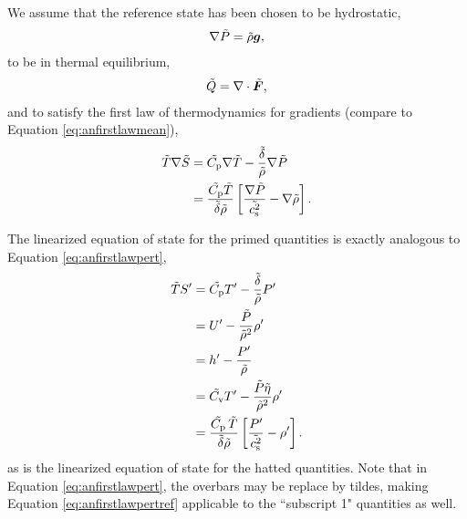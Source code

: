 \documentclass[12pt]{article}
\newcommand{\vecf}{\bm{F}}
\begin{document}
We assume that the reference state has been chosen to be hydrostatic,
\begin{align}\label{eq:refhydro}
	\nabla \tilde{P} = \tilde{\rho}\bm{g},
\end{align}
to be in thermal equilibrium,
\begin{align}\label{eq:refthermalequil}
	\tilde{Q} = \Div\tilde{\vecf},
\end{align}
and to satisfy the first law of thermodynamics for gradients (compare to Equation \eqref{eq:anfirstlawmean}),
\begin{subequations}\label{eq:reffirstlawmean}
	\begin{align}
		\tilde{T}\nabla\tilde{S} &= \tilde{C_{\rm{p}}}\nabla\tilde{T} - \frac{\tilde{\delta} }{\tilde{\rho}}\nabla\tilde{P} \\
		&= \frac{\tilde{C_{\rm{p}}}\tilde{T}}{\tilde{\delta} \tilde{\rho}}\left[\frac{\nabla\tilde{P}}{\tilde{c_{\rm s}^2}}-\nabla\tilde{\rho}\right].
	\end{align}
\end{subequations}

The linearized equation of state for the primed quantities is exactly analogous to Equation \eqref{eq:anfirstlawpert},
  \begin{subequations}\label{eq:reffirstlawpert}
	\begin{align}
		\tilde{T} {S^\prime} &= \tilde{C_{\rm{p}}} {T^\prime} - \frac{\tilde{\delta}}{\tilde{\rho}} {P^\prime}\label{eq:reffirstlawperttmpprs}\\
		&= {U^\prime} - \frac{\tilde{P}}{\tilde{\rho}^2}{\rho^\prime} \label{eq:reffirstlawpertinterho}\\
		&= {h^\prime} - \frac{{P^\prime}}{\tilde{\rho}}\label{eq:reffirstlawpertenthprs}\\
		&= \tilde{C_{\rm{v}}} {T^\prime} - \frac{\tilde{P}\tilde{\eta}}{\tilde{\rho}^2}{\rho^\prime}\label{eq:reffirstlawperttmprho}\\		
		&= \frac{\tilde{C_{\rm{p}}}\, \tilde{T}}{\tilde{\delta}\tilde{\rho}}\left[\frac{{P^\prime}}{\tilde{c_{\rm s}^2}}-{\rho^\prime}\right].\label{eq:reffirstlawpertprsrho}
	\end{align}
\end{subequations}
as is the linearized equation of state for the hatted quantities. Note that in Equation \eqref{eq:anfirstlawpert}, the overbars may be replace by tildes, making Equation \eqref{eq:anfirstlawpertref} applicable to the ``subscript 1" quantities as well. 
\end{document}
